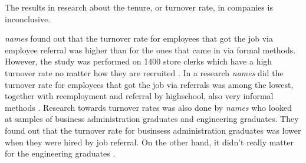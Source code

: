\documentclass[Main.tex]{subfiles}
\begin{document}
The results in research about the tenure, or turnover rate, in companies is inconclusive.

\emph{names} found out that the turnover rate for employees that got the job via employee referral was higher than for the ones that came in via formal methods. However, the study was performed on 1400 store clerks which have a high turnover rate no matter how they are recruited \cite{second}. In a research \emph{names} did the turnover rate for employees that got the job via referrals was among the lowest, together with reemployment and referral by highschool, also very informal methods \cite{seventh}.
Research towards turnover rates was also done by \emph{names} who looked at samples of business administration graduates and engineering graduates. They found out that the turnover rate for businsess administration graduates was lower when they were hired by job referral. On the other hand, it didn't really matter for the engineering graduates \cite{eleventh}.


\end{document}
